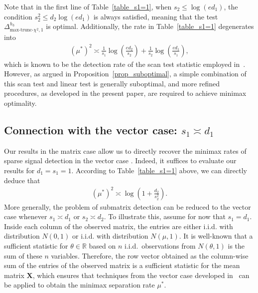 \documentclass{article}
\newcommand{\X}{\mathbf{X}}
\newcommand{\chisqmax}{\text{max-trunc-$\chi^2$}}
\theoremstyle{remark}
\begin{document}
Note that in the first line of Table~\ref{table_s1=1}, when $s_2 \leq \log(ed_1)$, the condition $s_2^2 \leq d_2 \log(ed_1)$ is always satisfied, meaning that the test $\Delta^{h_3}_{\chisqmax, 1}$ is optimal. 
Additionally, the rate in Table~\ref{table_s1=1} degenerates into 
\begin{align*}
    (\mu^*)^2 \asymp \frac{1}{s_1} \log\left(\frac{ed_2}{s_2}\right) + \frac{1}{s_2} \log\left(\frac{ed_1}{s_1}\right),
\end{align*}
which is known to be the detection rate of the scan test statistic employed in~\cite{butucea2013detection}. 
However, as argued in Proposition~\ref{prop_suboptimal}, a simple combination of this scan test and linear test is generally suboptimal, and more refined procedures, as developed in the present paper, are required to achieve minimax optimality.




\subsection{Connection with the vector case: $s_1 \asymp d_1$}\label{subsec_vector_case}

    Our results in the matrix case allow us to directly recover the minimax rates of sparse signal detection in the vector case \citep{collier2017minimax}. 
    Indeed, it suffices to evaluate our results for $d_1 = s_1 = 1$. According to Table~\ref{table_s1=1} above, we can directly deduce that 
    \begin{align*}
        (\mu^*)^2 \asymp \log\left(1+ \frac{d_2}{s_2^2}\right).
    \end{align*}
    More generally, the problem of submatrix detection can be reduced to the vector case whenever $s_1 \asymp d_1$ or $s_2 \asymp d_2$. 
    To illustrate this, assume for now that $s_1 = d_1$. Inside each column of the observed matrix, the entries are either i.i.d. with distribution $N(0,1)$ or i.i.d. with distribution $N(\mu, 1)$. 
    It is well-known that a sufficient statistic for $\theta \in \mathbb{R}$ based on $n$ i.i.d.\ observations from $N(\theta,1)$ is the sum of these $n$ variables. 
    Therefore, the row vector obtained as the column-wise sum of the entries of the observed matrix is a sufficient statistic for the mean matrix $\X$, which ensures that techniques from the vector case developed in~\cite{collier2017minimax} can be applied to obtain the minimax separation rate $\mu^*$. 
    
\end{document}
